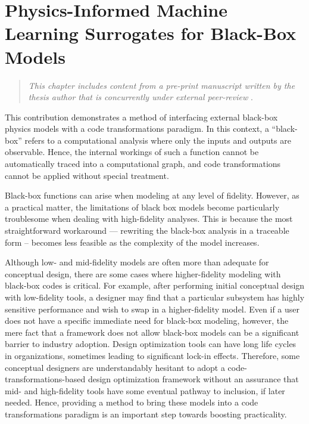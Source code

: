 \chapter{Physics-Informed Machine Learning Surrogates for Black-Box Models}
\label{sec:physics_informed_ml}

\begin{quote}
    \emph{This chapter includes content from a pre-print manuscript written by the thesis author that is concurrently under external peer-review} \cite{neuralfoil_preprint, neuralfoil_github}.
\end{quote}

This contribution demonstrates a method of interfacing external black-box physics models with a code transformations paradigm. In this context, a ``black-box'' refers to a computational analysis where only the inputs and outputs are observable. Hence, the internal workings of such a function cannot be automatically traced into a computational graph, and code transformations cannot be applied without special treatment.

Black-box functions can arise when modeling at any level of fidelity. However, as a practical matter, the limitations of black box models become particularly troublesome when dealing with high-fidelity analyses. This is because the most straightforward workaround — rewriting the black-box analysis in a traceable form -- becomes less feasible as the complexity of the model increases.

Although low- and mid-fidelity models are often more than adequate for conceptual design, there are some cases where higher-fidelity modeling with black-box codes is critical. For example, after performing initial conceptual design with low-fidelity tools, a designer may find that a particular subsystem has highly sensitive performance and wish to swap in a higher-fidelity model. Even if a user does not have a specific immediate need for black-box modeling, however, the mere fact that a framework does not allow black-box models can be a significant barrier to industry adoption. Design optimization tools can have long life cycles in organizations, sometimes leading to significant lock-in effects. Therefore, some conceptual designers are understandably hesitant to adopt a code-transformations-based design optimization framework without an assurance that mid- and high-fidelity tools have some eventual pathway to inclusion, if later needed. Hence, providing a method to bring these models into a code transformations paradigm is an important step towards boosting practicality.


